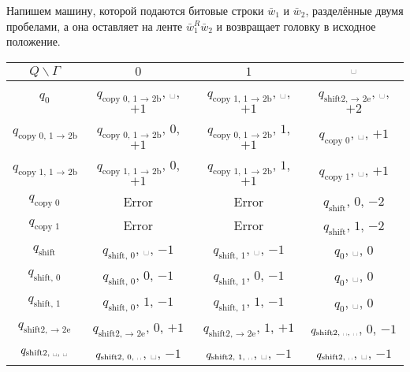 \documentclass[12pt,a4paper]{article}
\newcommand{\spacesymbol}{\ensuremath{\text{\textvisiblespace}}}
\begin{document}
    \begin{enumproblem}
        Напишем машину, которой подаются битовые строки $\bar{w}_1$ и $\bar{w}_2$, разделённые двумя пробелами, а она оставляет на ленте $\bar{w}_1^R \bar{w}_2$ и возвращает головку в исходное положение.
        \begin{table}[H]
            \centering
            \begin{tabular}{c||c|c|c}
                $Q\backslash\Gamma$& $0$& $1$& $\spacesymbol$\\
                \hline
                \hline
                $q_0$& $q_{\text{copy 0, 1 $\to$ 2b}}$, \spacesymbol, $+1$& $q_{\text{copy 1, 1 $\to$ 2b}}$, \spacesymbol, $+1$& $q_{\text{shift2, $\to$ 2e}}$, \spacesymbol, $+2$\\
                \hline
                $q_{\text{copy 0, 1 $\to$ 2b}}$& $q_{\text{copy 0, 1 $\to$ 2b}}$, $0$, $+1$& $q_{\text{copy 0, 1 $\to$ 2b}}$, $1$, $+1$& $q_{\text{copy 0}}$, \spacesymbol, $+1$\\
                \hline
                $q_{\text{copy 1, 1 $\to$ 2b}}$& $q_{\text{copy 1, 1 $\to$ 2b}}$, $0$, $+1$& $q_{\text{copy 1, 1 $\to$ 2b}}$, $1$, $+1$& $q_{\text{copy 1}}$, \spacesymbol, $+1$\\
                \hline
                $q_{\text{copy 0}}$& Error& Error& $q_{\text{shift}}$, $0$, $-2$\\
                \hline
                $q_{\text{copy 1}}$& Error& Error& $q_{\text{shift}}$, $1$, $-2$\\
                \hline
                $q_{\text{shift}}$& $q_{\text{shift, 0}}$, \spacesymbol, $-1$& $q_{\text{shift, 1}}$, \spacesymbol, $-1$& $q_0$, \spacesymbol, $0$\\
                \hline
                $q_{\text{shift, 0}}$& $q_{\text{shift, 0}}$, $0$, $-1$& $q_{\text{shift, 1}}$, $0$, $-1$& $q_0$, \spacesymbol, $0$\\
                \hline
                $q_{\text{shift, 1}}$& $q_{\text{shift, 0}}$, $1$, $-1$& $q_{\text{shift, 1}}$, $1$, $-1$& $q_0$, \spacesymbol, $0$\\
                \hline
                $q_{\text{shift2, $\to$ 2e}}$& $q_{\text{shift2, $\to$ 2e}}$, $0$, $+1$& $q_{\text{shift2, $\to$ 2e}}$, $1$, $+1$& $q_{\text{shift2, \spacesymbol, \spacesymbol}}$, $0$, $-1$\\
                \hline
                $q_{\text{shift2, \spacesymbol, \spacesymbol}}$& $q_{\text{shift2, 0, \spacesymbol}}$, \spacesymbol, $-1$& $q_{\text{shift2, 1, \spacesymbol}}$, \spacesymbol, $-1$& $q_{\text{shift2, \spacesymbol}}$, \spacesymbol, $-1$\\

\end{tabular}
\end{table}
\end{enumproblem}
\end{document}
